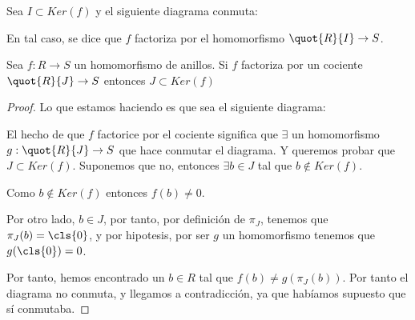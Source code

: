 \begin{prop}
Sea $I \subset Ker(f)$ y el siguiente diagrama conmuta:


En tal caso, se dice que $f$ factoriza por el homomorfismo $\quot{R}{I} \rightarrow S$.
\end{prop}


\begin{prop}
	Sea $f: R \rightarrow S$ un homomorfismo de anillos. Si $f$ factoriza por un cociente $\quot{R}{J} \rightarrow S$ entonces $J \subset Ker(f)$
\end{prop}

\begin{proof}
	Lo que estamos haciendo es que sea el siguiente diagrama:

El hecho de que $f$ factorice por el cociente significa que $\exists$ un homomorfismo $g: \quot{R}{J}\rightarrow S$ que hace conmutar el diagrama. Y queremos probar que $J \subset Ker(f)$. Suponemos que no, entonces $\exists b \in J$ tal que $b \notin Ker(f)$.

Como $b \notin Ker(f)$ entonces $f(b) \neq 0$.

Por otro lado, $b \in J$, por tanto, por definición de $\pi_J$, tenemos que $\pi_J(b)=\cls{0}$, y por hipotesis, por ser $g$ un homomorfismo tenemos que $g(\cls{0})=0$.

Por tanto, hemos encontrado un $b \in R$ tal que $f(b)\neq g(\pi_J(b))$. Por tanto el diagrama no conmuta, y llegamos a contradicción, ya que habíamos supuesto que sí conmutaba.
\end{proof}

